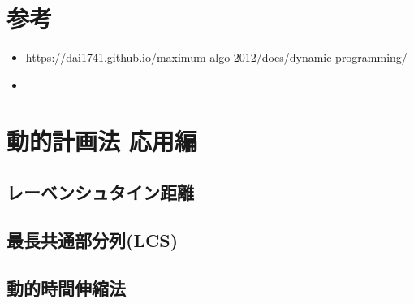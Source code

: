 \documentclass{jlreq}
\begin{document}
\section{参考}
\begin{itemize}
  \item \url{https://dai1741.github.io/maximum-algo-2012/docs/dynamic-programming/}
  \item \url{}
\end{itemize}

\section{動的計画法 応用編}
\subsection{レーベンシュタイン距離}
\subsection{最長共通部分列(LCS)}
\subsection{動的時間伸縮法}
\end{document}
